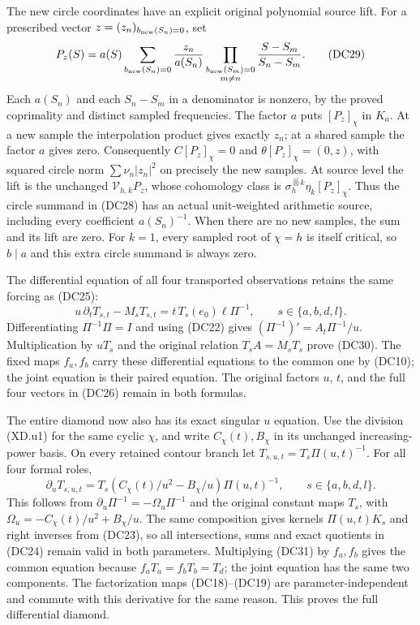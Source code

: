 The new circle coordinates have an explicit original polynomial
source lift.  For a prescribed vector
$z=(z_n)_{b_{\rm new}(S_n)=0}$, set
\[
 P_z(S)=a(S)\sum_{b_{\rm new}(S_n)=0}
 \frac{z_n}{a(S_n)}
 \prod_{\substack{b_{\rm new}(S_m)=0\\m\ne n}}
              \frac{S-S_m}{S_n-S_m}.
 \tag{DC29}
\]
Each $a(S_n)$ and each $S_n-S_m$ in a denominator is nonzero,
by the proved coprimality and distinct sampled frequencies.
The factor $a$ puts $[P_z]_\chi$ in $K_a$.
At a new sample the interpolation product gives exactly $z_n$;
at a shared sample the factor $a$ gives zero.  Consequently
$C[P_z]_\chi=0$ and $\theta[P_z]_\chi=(0,z)$, with squared
circle norm $\sum\nu_n|z_n|^2$ on precisely the new samples.
At source level the lift is the unchanged
$\mathcal V_{h,k}P_z$, whose cohomology class is
$\sigma_h^{\widehat\otimes k}\eta_k[P_z]_\chi$.
Thus the circle summand in (DC28) has an actual unit-weighted
arithmetic source, including every coefficient $a(S_n)^{-1}$.
When there are no new samples, the sum and its lift are zero.
For $k=1$, every sampled root of $\chi=h$ is itself critical,
so $b\mid a$ and this extra circle summand is always zero.

The differential equation of all four transported observations
retains the same forcing as (DC25):
\[
 \boxed{
 u\,\partial_tT_{s,t}-M_sT_{s,t}
       =t\,T_s(e_0)\ell\Pi^{-1},\qquad s\in\{a,b,d,l\}.}
 \tag{DC30}
\]
Differentiating $\Pi^{-1}\Pi=I$ and using (DC22) gives
$(\Pi^{-1})'=A_t\Pi^{-1}/u$.  Multiplication by $uT_s$
and the original relation $T_sA=M_sT_s$ prove (DC30).
The fixed maps $f_a,f_b$ carry these differential equations
to the common one by (DC10); the joint equation is their
paired equation.  The original factors $u$, $t$, and the
full four vectors in (DC26) remain in both formulas.


The entire diamond now also has its exact singular $u$ equation.
Use the division (XD.u1) for the same cyclic $\chi$, and write
$C_\chi(t),B_\chi$ in its unchanged increasing-power basis.
On every retained contour branch let
$T_{s,u,t}=T_s\Pi(u,t)^{-1}$.  For all four formal roles,
\[
 \boxed{\partial_uT_{s,u,t}
       =T_s(C_\chi(t)/u^2-B_\chi/u)\Pi(u,t)^{-1},
          \qquad s\in\{a,b,d,l\}.}                 \tag{DC31}
\]
This follows from $\partial_u\Pi^{-1}=-\Omega_u\Pi^{-1}$
and the original constant maps $T_s$, with
$\Omega_u=-C_\chi(t)/u^2+B_\chi/u$.
The same composition gives kernels $\Pi(u,t)K_s$ and right
inverses from (DC23), so all intersections, sums and exact
quotients in (DC24) remain valid in both parameters.
Multiplying (DC31) by $f_a,f_b$ gives the common equation
because $f_aT_a=f_bT_b=T_d$; the joint equation has the same
two components.  The factorization maps (DC18)--(DC19) are
parameter-independent and commute with this derivative for
the same reason.  This proves the full differential diamond.

